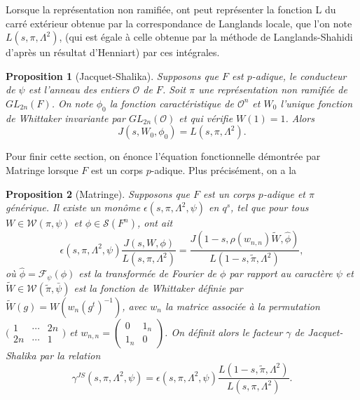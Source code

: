 \documentclass{amsart}
\newtheorem{proposition}{Proposition}[section]
\begin{document}
  Lorsque la représentation non ramifiée, ont peut représenter la fonction L du carré extérieur obtenue par la correspondance de Langlands locale, que l'on note $L(s, \pi, \Lambda^2)$, (qui est égale à celle obtenue par la méthode de Langlands-Shahidi d'après un résultat d'Henniart) par ces intégrales.
  \begin{proposition}[Jacquet-Shalika]
  \label{calculnr}
  Supposons que $F$ est $p$-adique, le conducteur de $\psi$ est l'anneau des entiers $\mathcal{O}$ de $F$. Soit $\pi$ une représentation non ramifiée de $GL_{2n}(F)$. On note $\phi_0$ la fonction caractéristique de $\mathcal{O}^n$ et $W_0$ l'unique fonction de Whittaker invariante par $GL_{2n}(\mathcal{O})$ et qui vérifie $W(1)=1$. Alors
   \begin{equation}
   J(s,W_0,\phi_0) = L(s, \pi, \Lambda^2).
    \end{equation}
  \end{proposition}
  
  Pour finir cette section, on énonce l'équation fonctionnelle démontrée par Matringe lorsque $F$ est un corps $p$-adique. Plus précisément, on a la
 \begin{proposition}[Matringe]
 \label{funcloc}
 Supposons que $F$ est un corps $p$-adique et $\pi$ générique. Il existe un monôme $\epsilon(s,\pi,\Lambda^2,\psi)$ en $q^s$, tel que pour tous $W \in \mathcal{W}(\pi,\psi)$ et $\phi \in \mathcal{S}(F^n)$, ont ait
 \begin{equation}
 \epsilon(s, \pi, \Lambda^2, \psi) \frac{J(s,W,\phi)}{L(s,\pi,\Lambda^2)}  = \frac{J(1-s,\rho(w_{n,n})\tilde{W},\hat{\phi})}{L(1-s,\tilde{\pi},\Lambda^2)},
 \end{equation}
 où $\hat{\phi} = \mathcal{F}_\psi(\phi)$ est la transformée de Fourier de $\phi$ par rapport au caractère $\psi$ et $\tilde{W} \in \mathcal{W}(\tilde{\pi}, \bar{\psi})$ est la fonction de Whittaker définie par $\tilde{W}(g) = W(w_n(g^t)^{-1})$, avec $w_n$ la matrice associée à la permutation $\bigl(\begin{smallmatrix}
    1 & \cdots & 2n  \\
    2n & \cdots &  1 
  \end{smallmatrix}\bigr)$
  et
 $w_{n,n} = \begin{pmatrix}
0 & 1_n \\
1_n & 0
\end{pmatrix}$. On définit alors le facteur $\gamma$ de Jacquet-Shalika par la relation
\begin{equation}
\gamma^{JS}(s,\pi,\Lambda^2,\psi)  = \epsilon(s,\pi,\Lambda^2,\psi)\frac{L(1-s,\tilde{\pi},\Lambda^2)}{L(s,\pi,\Lambda^2)}.
\end{equation}
 \end{proposition}
 
\end{document}

